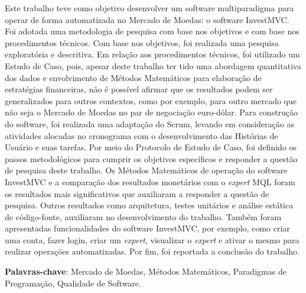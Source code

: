 \begin{resumo}
Este trabalho teve como objetivo desenvolver um software multiparadigma para operar de forma automatizada no Mercado de Moedas: o software InvestMVC. Foi adotada uma metodologia de pesquisa com base nos objetivos e com base nos procedimentos técnicos. Com base nos objetivos, foi realizada uma pesquisa exploratória e descritiva. Em relação aos procedimentos técnicos, foi utilizado um Estudo de Caso, pois, apesar deste trabalho ter tido uma abordagem quantitativa dos dados e envolvimento de Métodos Matemáticos para elaboração de estratégias financeiras, não é possível afirmar que os resultados podem ser generalizados para outros contextos, como por exemplo, para outro mercado que não seja o Mercado de Moedas no par de negociação euro-dólar. Para construção do software, foi realizada uma adaptação do Scrum, levando em consideração as atividades alocadas no cronograma com o desenvolvimento das Histórias de Usuário e suas tarefas. Por meio do Protocolo de Estudo de Caso, foi definido os passos metodológicos para cumprir os objetivos específicos e responder a questão de pesquisa deste trabalho. Os Métodos Matemáticos de operação do software InvestMVC e a comparação dos resultados monetários com o \textit{expert} MQL foram os resultados mais significativos que auxiliaram a responder a questão de pesquisa. Outros resultados como arquitetura, testes unitários e análise estática de código-fonte, auxiliaram no desenvolvimento do trabalho. Também foram apresentadas funcionalidades do software InvestMVC,  por exemplo, como criar uma conta, fazer login, criar um \textit{expert}, visualizar o \textit{expert} e ativar o mesmo para realizar operações automatizadas. Por fim, foi reportada a conclusão do trabalho.

\vspace{\onelineskip}
    
 \noindent
 \textbf{Palavras-chave}: Mercado de Moedas, Métodos Matemáticos, Paradigmas de Programação, Qualidade de Software.
\end{resumo}
